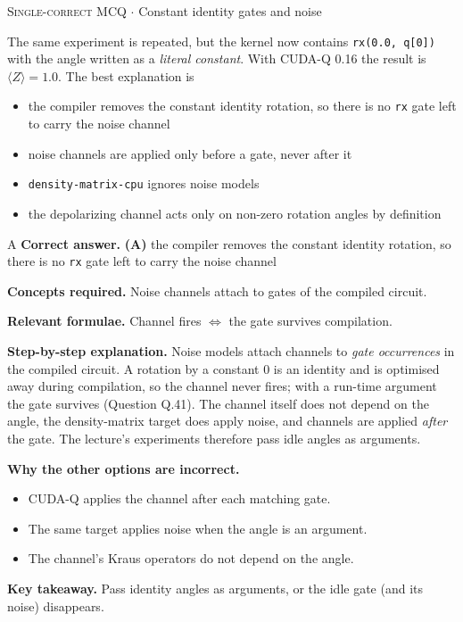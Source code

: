 \documentclass[11pt,a4paper]{article}
\newcommand{\optlabel}[1]{\textbf{(#1)}}
\newcommand{\correctlabel}[1]{\textcolor{okgreen}{\textbf{(#1)}\,\ding{51}}}
\newenvironment{qitem}[1]{\begin{list}{}{\setlength{\leftmargin}{3.3em}\setlength{\labelwidth}{3.1em}%
  \setlength{\labelsep}{0.2em}\setlength{\topsep}{3pt}\setlength{\parsep}{3pt}}\item[\textbf{Q.#1}\hfill]}{\end{list}}
\newcommand{\qsep}{\par\vspace{2pt}{\color{black!15}\hrule}\vspace{4pt}}
\newcommand{\qmeta}[2]{{\footnotesize\color{black!60}\textsc{#1} \;$\cdot$\; #2}\par}
\begin{document}
\begin{qitem}{42}
\qmeta{Single-correct MCQ}{Constant identity gates and noise}
The same experiment is repeated, but the kernel now contains \texttt{rx(0.0, q[0])} with the angle written as a \emph{literal constant}. With CUDA-Q 0.16
the result is $\langle Z\rangle = 1.0$. The best explanation is
\begin{itemize}[leftmargin=2.6em, labelsep=0.4em, itemsep=2pt, topsep=3pt]
\item[\correctlabel{A}] the compiler removes the constant identity rotation, so there is no \texttt{rx} gate left to carry the noise channel
\item[\optlabel{B}] noise channels are applied only before a gate, never after it
\item[\optlabel{C}] \texttt{density-matrix-cpu} ignores noise models
\item[\optlabel{D}] the depolarizing channel acts only on non-zero rotation angles by definition
\end{itemize}
\end{qitem}
\begin{solbox}{A}
\textbf{\color{brand}Correct answer.} \textcolor{okgreen}{\textbf{(A)}} the compiler removes the constant identity rotation, so there is no \texttt{rx} gate left to carry the noise channel

\textbf{\color{brand}Concepts required.} Noise channels attach to gates of the compiled circuit.

\textbf{\color{brand}Relevant formulae.} Channel fires $\Leftrightarrow$ the gate survives compilation.

\textbf{\color{brand}Step-by-step explanation.} Noise models attach channels to \emph{gate occurrences} in the compiled circuit. A rotation by a constant $0$ is an identity and is optimised away
during compilation, so the channel never fires; with a run-time argument the gate survives (Question Q.41). The channel itself does not depend on the
angle, the density-matrix target does apply noise, and channels are applied \emph{after} the gate. The lecture's experiments therefore pass idle angles
as arguments.

\textbf{\color{brand}Why the other options are incorrect.}
\begin{itemize}[leftmargin=2.4em, itemsep=1pt, topsep=2pt]
\item[\textbf{(B)}] CUDA-Q applies the channel after each matching gate.
\item[\textbf{(C)}] The same target applies noise when the angle is an argument.
\item[\textbf{(D)}] The channel's Kraus operators do not depend on the angle.
\end{itemize}
\textbf{\color{brand}Key takeaway.} Pass identity angles as arguments, or the idle gate (and its noise) disappears.
\end{solbox}
\qsep
\end{document}
